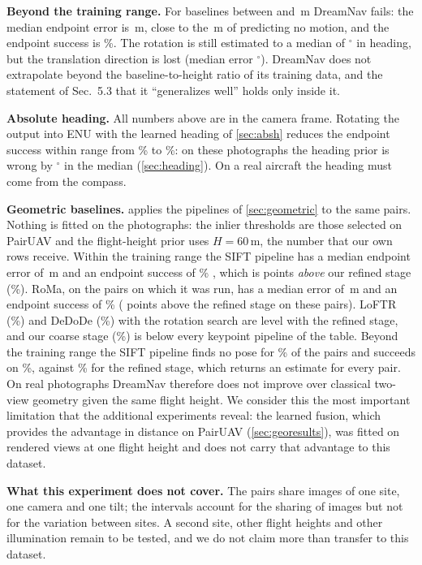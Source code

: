 \noindent\textbf{Beyond the training range.} For baselines between \rlInMax{} and \rlOutMax\,m DreamNav fails: the median endpoint error is \rlSiiOutPos\,m, close to the \rlZeroOutPos\,m of predicting no motion, and the endpoint success is \rlSiiOutSRe\%. The rotation is still estimated to a median of \rlSiiOutThetaMed$^\circ$ in heading, but the translation direction is lost (median error \rlSiiOutDir$^\circ$). DreamNav does not extrapolate beyond the baseline-to-height ratio of its training data, and the statement of Sec.~5.3 that it ``generalizes well'' holds only inside it.

\noindent\textbf{Absolute heading.} All numbers above are in the camera frame. Rotating the output into ENU with the learned heading of \cref{sec:absh} reduces the endpoint success within range from \rlSiiSRe\% to \rlEnuSRe\%: on these photographs the heading prior is wrong by \rlEnuHead$^\circ$ in the median (\cref{sec:heading}). On a real aircraft the heading must come from the compass.

\noindent\textbf{Geometric baselines.}  applies the pipelines of \cref{sec:geometric} to the same pairs. Nothing is fitted on the photographs: the inlier thresholds are those selected on PairUAV and the flight-height prior uses $H{=}60$\,m, the number that our own rows receive. Within the training range the SIFT pipeline has a median endpoint error of \grSiftEPEmed\,m \ci{\grSiftEPELo}{\grSiftEPEHi} and an endpoint success of \grSiftSRe\% \ci{\grSiftSReLo}{\grSiftSReHi}, which is \grSiftVsII{} points \ci{\grSiftVsIILo}{\grSiftVsIIHi} \emph{above} our refined stage (\grSiiSRe\%). RoMa, on the \grRomaN{} pairs on which it was run, has a median error of \grRomaEPEmed\,m and an endpoint success of \grRomaSRe\% (\grRomaVsII{} points \ci{\grRomaVsIILo}{\grRomaVsIIHi} above the refined stage on these pairs). LoFTR (\grLoftrSRe\%) and DeDoDe (\grDedodeSRe\%) with the rotation search are level with the refined stage, and our coarse stage (\grSiSRe\%) is below every keypoint pipeline of the table. Beyond the training range the SIFT pipeline finds no pose for \groSiftFail\% of the pairs and succeeds on \groSiftSRe\%, against \groSiiSRe\% for the refined stage, which returns an estimate for every pair. On real photographs DreamNav therefore does not improve over classical two-view geometry given the same flight height. We consider this the most important limitation that the additional experiments reveal: the learned fusion, which provides the advantage in distance on PairUAV (\cref{sec:georesults}), was fitted on rendered views at one flight height and does not carry that advantage to this dataset.



\noindent\textbf{What this experiment does not cover.} The pairs share \rlImages{} images of one site, one camera and one tilt; the intervals account for the sharing of images but not for the variation between sites. A second site, other flight heights and other illumination remain to be tested, and we do not claim more than transfer to this dataset.
